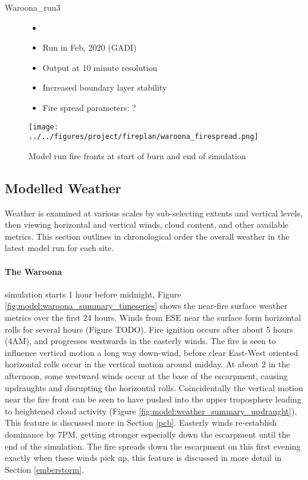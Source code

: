 \begin{description}
      \item [Waroona\_run3]
      \begin{itemize}
        \item []
        \item Run in Feb, 2020 (GADI)
        \item Output at 10 minute resolution
        \item Increased boundary layer stability
        \item Fire spread parameters: ?
      \end{itemize}
    \end{description}
    
    \begin{figure}
      \texttt{[image: ../../figures/project/fireplan/waroona\_firespread.png]}
      \caption{Model run fire fronts at start of burn and end of simulation}
      \label{fig:model:firespread_waroona}
    \end{figure}
    
    
  \subsection{Modelled Weather}
    \label{model:weather_summary}
    
    Weather is examined at various scales by sub-selecting extents and vertical levels, then viewing horizontal and vertical winds, cloud content, and other available metrics. This section outlines in chronological order the overall weather in the latest model run for each site.
    
    \paragraph{The Waroona} simulation starts 1 hour before midnight, Figure \ref{fig:model:waroona_summary_timeseries} shows the near-fire surface weather metrics over the first 24 hours.
    Winds from ESE near the surface form horizontal rolls for several hours (Figure TODO). Fire ignition occurs after about 5 hours (4AM), and progresses westwards in the easterly winds. 
    The fire is seen to influence vertical motion a long way down-wind, before clear East-West oriented horizontal rolls occur in the vertical motion around midday. 
    At about 2 in the afternoon, some westward winds occur at the base of the escarpment, causing updraughts and disrupting the horizontal rolls.
    Coincidentally the vertical motion near the fire front can be seen to have pushed into the upper troposphere leading to heightened cloud activity (Figure \ref{fig:model:weather_summary_updraught}), This feature is discussed more in Section \ref{pcb}.
    Easterly winds re-establish dominance by 7PM, getting stronger especially down the escarpment until the end of the simulation.
    The fire spreads down the escarpment on this first evening exactly when these winds pick up, this feature is discussed in more detail in Section \ref{emberstorm}.
    
